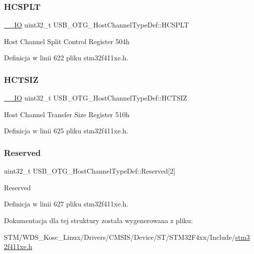 \subsubsection{\texorpdfstring{H\+C\+S\+P\+LT}{HCSPLT}}
{\footnotesize\ttfamily \hyperlink{core__sc300_8h_aec43007d9998a0a0e01faede4133d6be}{\+\_\+\+\_\+\+IO} uint32\+\_\+t U\+S\+B\+\_\+\+O\+T\+G\+\_\+\+Host\+Channel\+Type\+Def\+::\+H\+C\+S\+P\+LT}

Host Channel Split Control Register 504h 

Definicja w linii 622 pliku stm32f411xe.\+h.

\mbox{\label{struct_u_s_b___o_t_g___host_channel_type_def_a14cb8c8dbbafdef182c82c0493ca48ab}} 
\subsubsection{\texorpdfstring{H\+C\+T\+S\+IZ}{HCTSIZ}}
{\footnotesize\ttfamily \hyperlink{core__sc300_8h_aec43007d9998a0a0e01faede4133d6be}{\+\_\+\+\_\+\+IO} uint32\+\_\+t U\+S\+B\+\_\+\+O\+T\+G\+\_\+\+Host\+Channel\+Type\+Def\+::\+H\+C\+T\+S\+IZ}

Host Channel Transfer Size Register 510h 

Definicja w linii 625 pliku stm32f411xe.\+h.

\mbox{\label{struct_u_s_b___o_t_g___host_channel_type_def_aa85d014d19b79d61bed7fdf134ed1037}} 
\subsubsection{\texorpdfstring{Reserved}{Reserved}}
{\footnotesize\ttfamily uint32\+\_\+t U\+S\+B\+\_\+\+O\+T\+G\+\_\+\+Host\+Channel\+Type\+Def\+::\+Reserved\mbox{[}2\mbox{]}}

Reserved 

Definicja w linii 627 pliku stm32f411xe.\+h.



Dokumentacja dla tej struktury została wygenerowana z pliku\+:\begin{DoxyCompactItemize}
\item 
S\+T\+M/\+W\+D\+S\+\_\+\+Kosc\+\_\+\+Linux/\+Drivers/\+C\+M\+S\+I\+S/\+Device/\+S\+T/\+S\+T\+M32\+F4xx/\+Include/\hyperlink{stm32f411xe_8h}{stm32f411xe.\+h}\end{DoxyCompactItemize}
